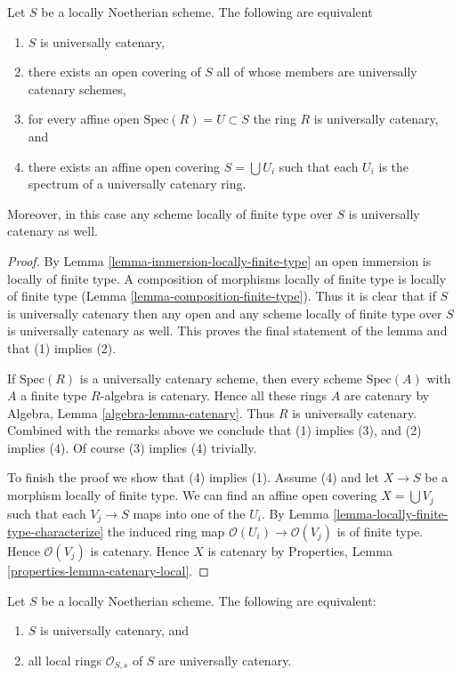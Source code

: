 \begin{lemma}
\label{lemma-universally-catenary-local}
Let $S$ be a locally Noetherian scheme. The following are equivalent
\begin{enumerate}
\item $S$ is universally catenary,
\item there exists an open covering of $S$ all of whose members are
universally catenary schemes,
\item for every affine open $\text{Spec}(R) = U \subset S$ the ring
$R$ is universally catenary, and
\item there exists an affine open covering $S = \bigcup U_i$ such
that each $U_i$ is the spectrum of a universally catenary ring.
\end{enumerate}
Moreover, in this case any scheme locally of finite type over $S$
is universally catenary as well.
\end{lemma}

\begin{proof}
By Lemma \ref{lemma-immersion-locally-finite-type} an open immersion
is locally of finite type. A composition of morphisms locally of
finite type is locally of finite type
(Lemma \ref{lemma-composition-finite-type}). Thus it is clear that if $S$ is
universally catenary then any open and any scheme locally of finite
type over $S$ is universally catenary as well. This proves the final
statement of the lemma and that (1) implies (2).

\medskip\noindent
If $\text{Spec}(R)$ is a universally catenary scheme, then every
scheme $\text{Spec}(A)$ with $A$ a finite type $R$-algebra is
catenary. Hence all these rings $A$ are catenary by
Algebra, Lemma \ref{algebra-lemma-catenary}.
Thus $R$ is universally catenary. Combined with the remarks above we
conclude that (1) implies (3), and (2) implies (4). Of course
(3) implies (4) trivially.

\medskip\noindent
To finish the proof we show that (4) implies (1).
Assume (4) and let $X \to S$ be a morphism locally of finite type.
We can find an affine open covering $X = \bigcup V_j$ such that
each $V_j \to S$ maps into one of the $U_i$. By
Lemma \ref{lemma-locally-finite-type-characterize}
the induced ring map $\mathcal{O}(U_i) \to \mathcal{O}(V_j)$ is
of finite type. Hence $\mathcal{O}(V_j)$ is catenary. Hence
$X$ is catenary by Properties, Lemma \ref{properties-lemma-catenary-local}.
\end{proof}

\begin{lemma}
\label{lemma-universally-catenary-local-rings-universally-catenary}
Let $S$ be a locally Noetherian scheme.
The following are equivalent:
\begin{enumerate}
\item $S$ is universally catenary, and
\item all local rings $\mathcal{O}_{S, s}$ of $S$ are universally catenary.
\end{enumerate}
\end{lemma}

